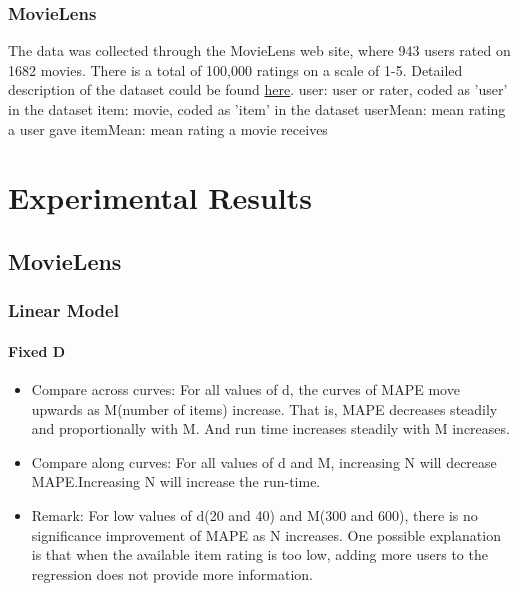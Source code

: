 \documentclass[12pt]{article}
\begin{document}
\subsubsection{MovieLens}
The data was collected through the MovieLens web site, where 943 users rated on 1682 movies. There is a total of 100,000 ratings on a scale of 1-5. Detailed description of the dataset could be found \href{https://files.grouplens.org/datasets/movielens/ml-100k-README.txt}{here}.
\newline \newline
user: user or rater, coded as 'user' in the dataset
\newline
item: movie, coded as 'item' in the dataset
\newline
userMean: mean rating a user gave
\newline
itemMean: mean rating a movie receives


\section{Experimental Results}
\listoffigures

\subsection{MovieLens}
\subsubsection{Linear Model}

\paragraph{Fixed D}
\begin{itemize}
\item Compare across curves:\newline
For all values of d, the curves of MAPE move upwards as M(number of items) increase. That is, MAPE decreases steadily and proportionally with M. And run time increases steadily with M increases. 
\newline
\item Compare along curves:
For all values of d and M, increasing N will decrease MAPE.Increasing N will increase the run-time. 
\item Remark:\newline
For low values of d(20 and 40) and M(300 and 600), there is no significance improvement of MAPE as N increases. One possible explanation is that when the available item rating is too low, adding more users to the regression does not provide more information. 
\end{itemize}
\end{document}
